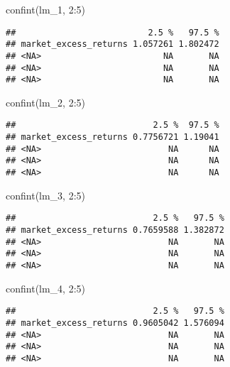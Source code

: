 \documentclass[
]{article}
\newenvironment{Shaded}{\begin{snugshade}}{\end{snugshade}}
\newcommand{\DecValTok}[1]{\textcolor[rgb]{0.00,0.00,0.81}{#1}}
\newcommand{\FunctionTok}[1]{\textcolor[rgb]{0.00,0.00,0.00}{#1}}
\newcommand{\NormalTok}[1]{#1}
\newcommand{\SpecialCharTok}[1]{\textcolor[rgb]{0.00,0.00,0.00}{#1}}
\begin{document}
\begin{Shaded}
\begin{Highlighting}[]
\FunctionTok{confint}\NormalTok{(lm\_1, }\DecValTok{2}\SpecialCharTok{:}\DecValTok{5}\NormalTok{)}
\end{Highlighting}
\end{Shaded}

\begin{verbatim}
##                          2.5 %   97.5 %
## market_excess_returns 1.057261 1.802472
## <NA>                        NA       NA
## <NA>                        NA       NA
## <NA>                        NA       NA
\end{verbatim}

\begin{Shaded}
\begin{Highlighting}[]
\FunctionTok{confint}\NormalTok{(lm\_2, }\DecValTok{2}\SpecialCharTok{:}\DecValTok{5}\NormalTok{)}
\end{Highlighting}
\end{Shaded}

\begin{verbatim}
##                           2.5 %  97.5 %
## market_excess_returns 0.7756721 1.19041
## <NA>                         NA      NA
## <NA>                         NA      NA
## <NA>                         NA      NA
\end{verbatim}

\begin{Shaded}
\begin{Highlighting}[]
\FunctionTok{confint}\NormalTok{(lm\_3, }\DecValTok{2}\SpecialCharTok{:}\DecValTok{5}\NormalTok{)}
\end{Highlighting}
\end{Shaded}

\begin{verbatim}
##                           2.5 %   97.5 %
## market_excess_returns 0.7659588 1.382872
## <NA>                         NA       NA
## <NA>                         NA       NA
## <NA>                         NA       NA
\end{verbatim}

\begin{Shaded}
\begin{Highlighting}[]
\FunctionTok{confint}\NormalTok{(lm\_4, }\DecValTok{2}\SpecialCharTok{:}\DecValTok{5}\NormalTok{)}
\end{Highlighting}
\end{Shaded}

\begin{verbatim}
##                           2.5 %   97.5 %
## market_excess_returns 0.9605042 1.576094
## <NA>                         NA       NA
## <NA>                         NA       NA
## <NA>                         NA       NA
\end{verbatim}
\end{document}
